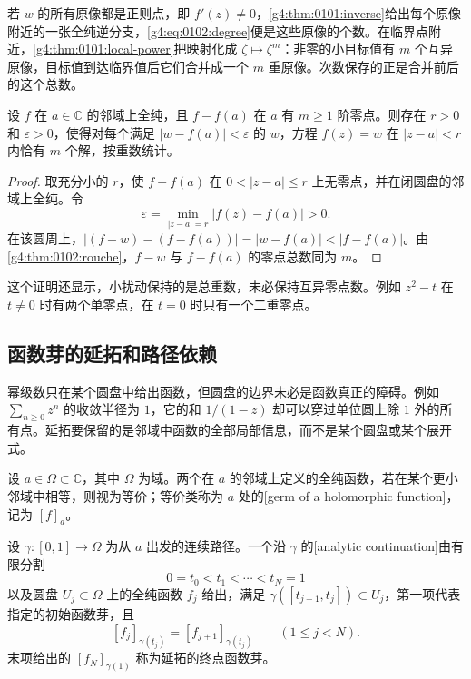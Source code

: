 \ProseParagraphBreak

若 \(w\) 的所有原像都是正则点，即 \(f'(z)\neq0\)，\cref{g4:thm:0101:inverse}给出每个原像附近的一张全纯逆分支，\eqref{g4:eq:0102:degree}便是这些原像的个数。在临界点附近，\cref{g4:thm:0101:local-power}把映射化成 \(\zeta\mapsto\zeta^m\)：非零的小目标值有 \(m\) 个互异原像，目标值到达临界值后它们合并成一个 \(m\) 重原像。次数保存的正是合并前后的这个总数。

\begin{proposition}\label{g4:prop:0102:local-count}
	设 \(f\) 在 \(a\in\mathbb C\) 的邻域上全纯，且 \(f-f(a)\) 在 \(a\) 有 \(m\geq1\) 阶零点。则存在 \(r>0\) 和 \(\varepsilon>0\)，使得对每个满足 \(|w-f(a)|<\varepsilon\) 的 \(w\)，方程 \(f(z)=w\) 在 \(|z-a|<r\) 内恰有 \(m\) 个解，按重数统计。
\end{proposition}
\begin{proof}
	取充分小的 \(r\)，使 \(f-f(a)\) 在 \(0<|z-a|\leq r\) 上无零点，并在闭圆盘的邻域上全纯。令
	\[
		\varepsilon=\min_{|z-a|=r}|f(z)-f(a)|>0.
	\]
	在该圆周上，\(|(f-w)-(f-f(a))|=|w-f(a)|<|f-f(a)|\)。由\cref{g4:thm:0102:rouche}，\(f-w\) 与 \(f-f(a)\) 的零点总数同为 \(m\)。
\end{proof}

这个证明还显示，小扰动保持的是总重数，未必保持互异零点数。例如 \(z^2-t\) 在 \(t\neq0\) 时有两个单零点，在 \(t=0\) 时只有一个二重零点。

\subsection{函数芽的延拓和路径依赖}
\label{g4:subsec:0102:04}
幂级数只在某个圆盘中给出函数，但圆盘的边界未必是函数真正的障碍。例如 \(\sum_{n\geq0}z^n\) 的收敛半径为 \(1\)，它的和 \(1/(1-z)\) 却可以穿过单位圆上除 \(1\) 外的所有点。延拓要保留的是邻域中函数的全部局部信息，而不是某个圆盘或某个展开式。

\begin{definition}\label{g4:def:0102:germ-continuation}
	设 \(a\in\Omega\subset\mathbb C\)，其中 \(\Omega\) 为域。两个在 \(a\) 的邻域上定义的全纯函数，若在某个更小邻域中相等，则视为等价；等价类称为 \(a\) 处的[germ of a holomorphic function]，记为 \([f]_a\)。

	设 \(\gamma:[0,1]\rightarrow\Omega\) 为从 \(a\) 出发的连续路径。一个沿 \(\gamma\) 的[analytic continuation]由有限分割
	\[
		0=t_0<t_1<\cdots<t_N=1
	\]
	以及圆盘 \(U_j\subset\Omega\) 上的全纯函数 \(f_j\) 给出，满足 \(\gamma([t_{j-1},t_j])\subset U_j\)，第一项代表指定的初始函数芽，且
	\[
		[f_j]_{\gamma(t_j)}=[f_{j+1}]_{\gamma(t_j)}
		\qquad(1\leq j<N).
	\]
	末项给出的 \([f_N]_{\gamma(1)}\) 称为延拓的终点函数芽。
\end{definition}

